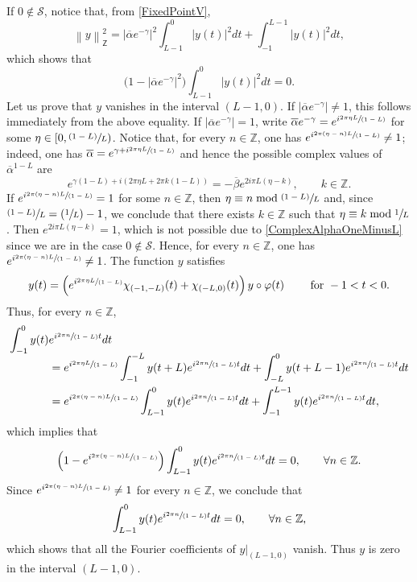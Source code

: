 \documentclass[JEP,XML,SOM,Unicode]{cedram}
\newcommand{\spfrac}[2]{\sfrac{#1}{(#2)}}
\newcommand{\psfrac}[2]{\sfrac{(#1)}{#2}}
\newcommand{\Psfrac}[2]{(\sfrac{#1}{#2})}
\theoremstyle{plain}
\theoremstyle{definition}
\newcommand{\norm}[1]{\left\lVert #1\right\lVert}
\newcommand{\abs}[1]{\left\lvert #1\right \rvert}
\begin{document}
If $0 \notin \mathcal S$, notice that, from \eqref{FixedPointV},
\[
\norm{y}_{\mathsf Z}^2 = \abs{\overline\alpha e^{-\gamma}}^2 \int_{L-1}^{0} \abs{y(t)}^2 dt + \int_{-1}^{L - 1} \abs{y(t)}^2 dt,
\]
which shows that
\[
\bigl(1 - \abs{\overline\alpha e^{-\gamma}}^2\bigr) \int_{L-1}^{0} \abs{y(t)}^2 dt = 0.
\]
Let us prove that $y$ vanishes in the interval $(L - 1, 0)$. If $\abs{\overline\alpha e^{-\gamma}} \neq 1$, this follows immediately from the above equality. If $\abs{\overline\alpha e^{-\gamma}} = 1$, write $\overline\alpha e^{-\gamma} = e^{i \spfrac{2\pi\eta L}{1 - L}}$ for some $\eta \in \left[0, \psfrac{1-L}{L}\right)$. Notice that, for every $n \in \mathbb Z$, one has $e^{i \spfrac{2\pi(\eta - n) L}{1 - L}} \neq 1$; indeed, one has $\overline\alpha = e^{\gamma + i \spfrac{2\pi\eta L}{1 - L}}$ and hence the possible complex values of $\overline\alpha^{1-L}$ are
\begin{equation}
\label{ComplexAlphaOneMinusL}
e^{\gamma (1 - L) + i (2\pi\eta L + 2\pi k (1 - L))} = -\overline\beta e^{2 i \pi L (\eta - k)}, \qquad k \in \mathbb Z.
\end{equation}
If $e^{i \spfrac{2\pi(\eta - n) L}{1 - L}} = 1$ for some $n \in \mathbb Z$, then $\eta \equiv n \bmod \psfrac{1-L}{L}$ and, since $\psfrac{1-L}{L} = \Psfrac{1}{L} - 1$, we conclude that there exists $k \in \mathbb Z$ such that $\eta \equiv k \bmod \sfrac{1}{L}$. Then $e^{2 i \pi L (\eta - k)} = 1$, which is not possible due to \eqref{ComplexAlphaOneMinusL} since we are in the case $0 \notin \mathcal S$. Hence, for every $n \in \mathbb Z$, one has $e^{i \spfrac{2\pi(\eta - n) L}{1 - L}} \neq 1$. The function $y$ satisfies
\[
y(t) = \left(e^{i \spfrac{2\pi\eta L}{1 - L}} \chi_{(-1, -L)}(t) + \chi_{(-L, 0)}(t)\right) y \circ \varphi(t) \qquad \text{ for } -1 < t < 0.
\]
Thus, for every $n \in \mathbb Z$,
\begin{align*}
\int_{-1}^0 y(t) &e^{i \spfrac{2 \pi n}{1-L} t} dt\\[-5pt]
 & = e^{i \spfrac{2\pi\eta L}{1 - L}} \int_{-1}^{-L} y(t + L) e^{i \spfrac{2 \pi n}{1-L} t} dt + \int_{-L}^0 y(t + L - 1) e^{i \spfrac{2 \pi n}{1-L} t} dt \\
& = e^{i \spfrac{2\pi(\eta - n) L}{1 - L}} \int_{L-1}^{0} y(t) e^{i \spfrac{2 \pi n}{1-L} t} dt + \int_{-1}^{L - 1} y(t) e^{i \spfrac{2 \pi n}{1-L} t} dt,
\end{align*}
which implies that
\[
\left(1 - e^{i \spfrac{2\pi(\eta - n) L}{1 - L}}\right) \int_{L-1}^{0} y(t) e^{i \spfrac{2 \pi n}{1-L} t} dt = 0, \qquad \forall n \in \mathbb Z.
\]
Since $e^{i \spfrac{2\pi(\eta - n) L}{1 - L}} \neq 1$ for every $n \in \mathbb Z$, we conclude that
\[
\int_{L-1}^{0} y(t) e^{i \spfrac{2 \pi n}{1-L} t} dt = 0, \qquad \forall n \in \mathbb Z,
\]
which shows that all the Fourier coefficients of $y|_{(L-1, 0)}$ vanish. Thus $y$ is zero in the interval $(L-1, 0)$.
\end{document}
